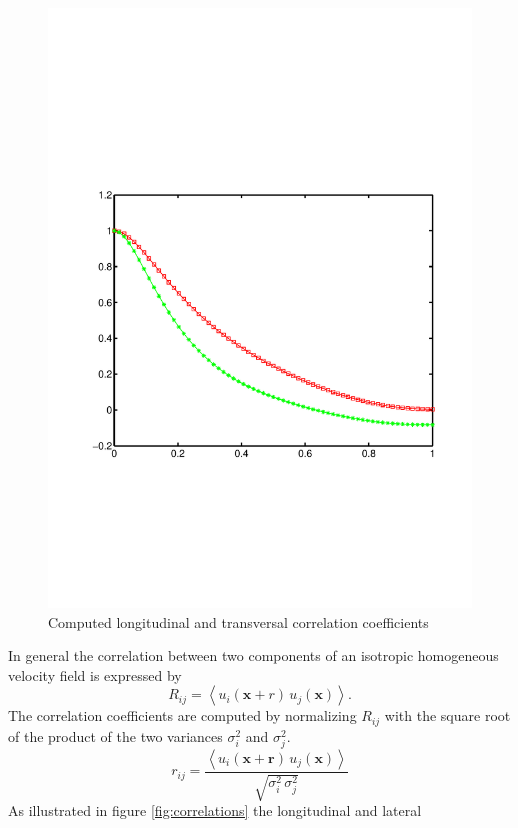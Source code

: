 \documentclass[preprint,12pt,ntfdMod]{elsarticle}
\begin{document}
\begin{par}
\begin{figure}[hbt]
      \includegraphics[scale=0.6]{correlation}
      \caption{Computed longitudinal and transversal correlation coefficients}
\end{figure}
In general the correlation between two components of an isotropic
homogeneous velocity field is expressed by
  \begin{equation}
      R_{ij} = \left<u_i(\mathbf{x}+r)\,u_j(\mathbf{x})\right>.
  \end{equation}
The correlation coefficients are computed by normalizing
$R_{ij}$ with the square root of the product of the two variances
$\sigma_i^2$ and $\sigma_j^2$.
  \begin{equation}
      r_{ij} = \frac{\left<u_i(\mathbf{x}+\mathbf{r})\,u_j(\mathbf{x})\right>}
                  {\sqrt{\sigma_i^2\,\sigma_j^2}}
  \end{equation}
As illustrated in figure \ref{fig:correlations} the longitudinal and lateral

\end{par}
\end{document}

